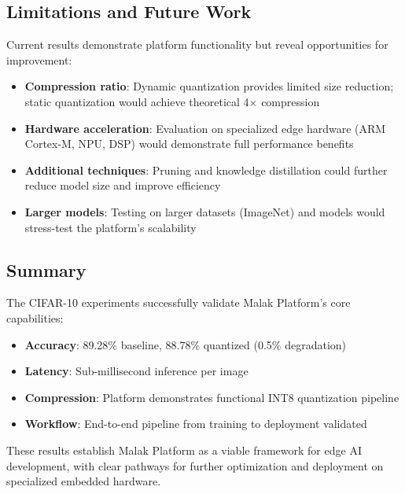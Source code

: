 \subsection{Limitations and Future Work}

Current results demonstrate platform functionality but reveal opportunities for improvement:

\begin{itemize}
\item \textbf{Compression ratio}: Dynamic quantization provides limited size reduction; static quantization would achieve theoretical 4$\times$ compression
\item \textbf{Hardware acceleration}: Evaluation on specialized edge hardware (ARM Cortex-M, NPU, DSP) would demonstrate full performance benefits
\item \textbf{Additional techniques}: Pruning and knowledge distillation could further reduce model size and improve efficiency
\item \textbf{Larger models}: Testing on larger datasets (ImageNet) and models would stress-test the platform's scalability
\end{itemize}

\subsection{Summary}

The CIFAR-10 experiments successfully validate Malak Platform's core capabilities:
\begin{itemize}
\item \textbf{Accuracy}: 89.28\% baseline, 88.78\% quantized (0.5\% degradation)
\item \textbf{Latency}: Sub-millisecond inference per image
\item \textbf{Compression}: Platform demonstrates functional INT8 quantization pipeline
\item \textbf{Workflow}: End-to-end pipeline from training to deployment validated
\end{itemize}

These results establish Malak Platform as a viable framework for edge AI development, with clear pathways for further optimization and deployment on specialized embedded hardware.
